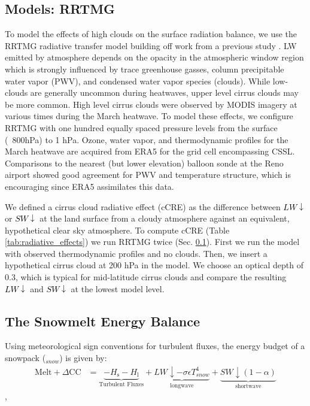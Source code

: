 \documentclass[12pt]{iopjournal}
\newcommand{\lwdn}{\textcolor{black}{$LW\downarrow$}\xspace}
\newcommand{\swdn}{\textcolor{black}{$SW\downarrow$}\xspace}
\begin{document}
\subsection{Models: RRTMG}\label{sec:models:rrtmg}

To model the effects of high clouds on the surface radiation balance, we use the RRTMG radiative transfer model \citep{Iacono2008-ax} building off work from a previous study \citep{Rudisill2025-cx}. 
LW emitted by atmosphere depends on the opacity in the atmospheric window region which is strongly influenced by trace greenhouse gasses, column precipitable water vapor (PWV), and condensed water vapor species (clouds).
While low-clouds are generally uncommon during heatwaves, upper level cirrus clouds may be more common. 
High level cirrus clouds were observed by MODIS imagery at various times during the March heatwave.
To model these effects, we configure RRTMG with one hundred equally spaced pressure levels from the surface (~800hPa) to 1 hPa. 
Ozone, water vapor, and thermodynamic profiles for the March heatwave are acquired from ERA5 for the grid cell encompassing CSSL.
Comparisons to the nearest (but lower elevation) balloon sonde at the Reno airport showed good agreement for PWV and temperature structure, which is encouraging since ERA5 assimilates this data. 

We defined a cirrus cloud radiative effect (cCRE) as the difference between \lwdn or \swdn at the land surface from a cloudy atmosphere against an equivalent, hypothetical clear sky atmosphere. 
To compute cCRE (Table \ref{tab:radiative_effects}) we run RRTMG twice (Sec. \ref{sec:models:rrtmg}).
First we run the model with observed thermodynamic profiles and no clouds. 
Then, we insert a hypothetical cirrus cloud at 200 hPa in the model. 
We choose an optical depth of 0.3, which is typical for mid-latitude cirrus clouds and compare the resulting \lwdn and \swdn at the lowest model level.



\subsection{The Snowmelt Energy Balance}\label{sec:snow_seb}
Using meteorological sign conventions for turbulent fluxes, the energy budget of a snowpack ($_{snow}$) is given by:
\begin{align}\label{eq:energy_budget}
\mathrm{Melt} + \Delta \mathrm{CC} 
&=
\underbrace{
    - H_\mathrm{s} - H_\mathrm{l}
}_{\text{Turbulent Fluxes}}
+
\underbrace{
LW\downarrow- \sigma\epsilon T_{snow}^4
}_{\text{longwave}}
+
\underbrace{
   SW\downarrow(1-\alpha)
}_{\text{shortwave}}
\end{align},
\end{document}
